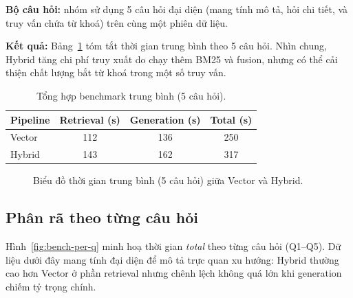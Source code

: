 \documentclass[10pt, conference, a4paper, compsocconf]{IEEEtran}
\begin{document}
\textbf{Bộ câu hỏi:} nhóm sử dụng 5 câu hỏi đại diện (mang tính mô tả, hỏi chi tiết, và truy vấn chứa từ khoá) trên cùng một phiên dữ liệu.

\textbf{Kết quả:} Bảng~\ref{tab:bench-summary} tóm tắt thời gian trung bình theo 5 câu hỏi. Nhìn chung, Hybrid tăng chi phí truy xuất do chạy thêm BM25 và fusion, nhưng có thể cải thiện chất lượng bắt từ khoá trong một số truy vấn.

\begin{table}[!htbp]
  \centering
  \caption{Tổng hợp benchmark trung bình (5 câu hỏi).}
  \label{tab:bench-summary}
  \begin{tabular}{lccc}
    \toprule
    \textbf{Pipeline} & \textbf{Retrieval (s)} & \textbf{Generation (s)} & \textbf{Total (s)} \\
    \midrule
    Vector            & 112                    & 136                     & 250                \\
    Hybrid            & 143                    & 162                     & 317                \\
    \bottomrule
  \end{tabular}
\end{table}

\begin{figure}[!htbp]
  \centering
  \caption{Biểu đồ thời gian trung bình (5 câu hỏi) giữa Vector và Hybrid.}
  \label{fig:bench-bar}
\end{figure}

\subsection{Phân rã theo từng câu hỏi}
Hình~\ref{fig:bench-per-q} minh hoạ thời gian \textit{total} theo từng câu hỏi (Q1--Q5). Dữ liệu dưới đây mang tính đại diện để mô tả trực quan xu hướng: Hybrid thường cao hơn Vector ở phần retrieval nhưng chênh lệch không quá lớn khi generation chiếm tỷ trọng chính.
\end{document}
